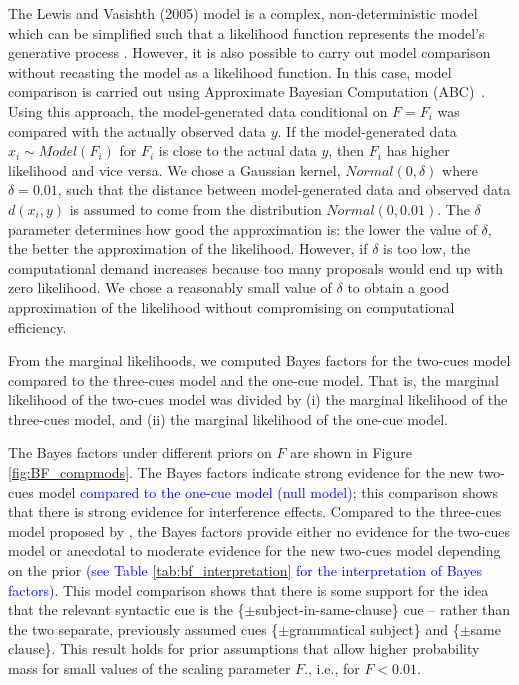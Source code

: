 \documentclass[review,preprint,12pt,authoryear,floatsintext]{elsarticle}
\begin{document}
{{The Lewis and Vasishth (2005) model is a complex, non-deterministic model which can be simplified such that a likelihood function represents the model's generative process  \citep[e.g., in][]{NicenboimRetrieval2018,lisson2020computational}. However, it is also possible to carry out model comparison without recasting the model as a likelihood function. In this case, model comparison is carried out using Approximate Bayesian Computation (ABC)~\citep{sisson2018handbook,palestro2018likelihood}. Using this approach, the model-generated data conditional on $F=F_i$ was compared with the actually observed data $y$. If the model-generated data $x_{i} \sim Model(F_i)$ for $F_i$ is close to the actual data $y$, then $F_i$ has higher likelihood and vice versa. \label{modeling} We chose a Gaussian kernel, $Normal(0,\delta)$ where $\delta=0.01$, such that the distance between model-generated data and observed data $d(x_i,y)$ is assumed to come from the distribution $Normal(0,0.01)$. The $\delta$ parameter determines how good the approximation is: the lower the value of $\delta$, the better the approximation of the likelihood. However, if $\delta$ is too low, the computational demand increases because too many proposals would end up with zero likelihood. We chose a reasonably small value of $\delta$ to obtain a good approximation of the likelihood without compromising on computational efficiency.

From the marginal likelihoods, we computed Bayes factors for the two-cues model compared to the three-cues model and the one-cue model. That is, the marginal likelihood of the two-cues model was divided by (i) the marginal likelihood of the three-cues model,  and (ii) the marginal likelihood of the one-cue model. 

The Bayes factors under different priors on $F$ are shown in Figure \ref{fig:BF_compmods}. The Bayes factors indicate strong evidence for the new two-cues model \textcolor{blue}{compared to the one-cue model (null model)}; this comparison shows that there is strong evidence for interference effects. Compared to the three-cues model proposed by \cite{mertzen}, the Bayes factors provide either no evidence for the two-cues model or anecdotal to moderate evidence for the new two-cues model depending on the prior \textcolor{blue}{(see Table \ref{tab:bf_interpretation} for the interpretation of Bayes factors)}. This model comparison shows that there is some support for the idea that the relevant syntactic cue is the \{$\pm$subject-in-same-clause\} cue – rather than the two separate, previously assumed cues \{$\pm$grammatical subject\} and \{$\pm$same clause\}. This result holds for prior assumptions that allow higher probability mass for small values of the scaling parameter $F$., i.e., for $F<0.01$.

}}
\end{document}
